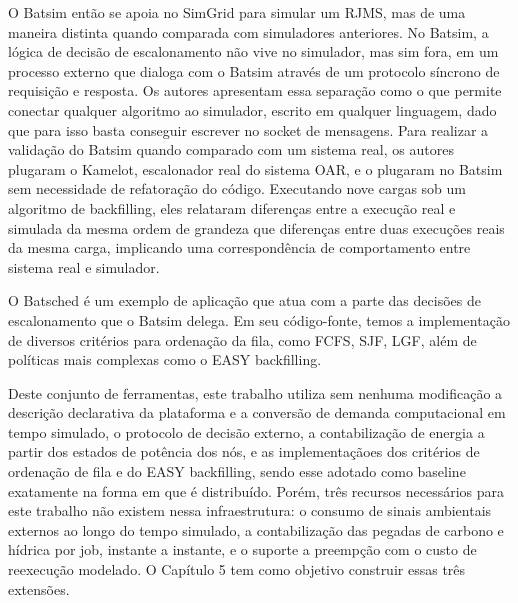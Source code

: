 O Batsim então se apoia no SimGrid para simular um RJMS, mas de uma maneira distinta quando comparada com 
simuladores anteriores. No Batsim, a lógica de decisão de escalonamento não vive no simulador, mas sim fora,
em um processo externo que dialoga com o Batsim através de um protocolo síncrono de requisição e resposta. 
Os autores apresentam essa separação como o que permite conectar qualquer algoritmo ao simulador, escrito em
qualquer linguagem, dado que para isso basta conseguir escrever no socket de mensagens. Para realizar a validação
do Batsim quando comparado com um sistema real, os autores plugaram o Kamelot, escalonador real do sistema OAR,
e o plugaram no Batsim sem necessidade de refatoração do código. Executando nove cargas sob um algoritmo de 
backfilling, eles relataram diferenças entre a execução real e simulada da mesma ordem de grandeza que diferenças
entre duas execuções reais da mesma carga, implicando uma correspondência de comportamento entre sistema real
e simulador.

O Batsched é um exemplo de aplicação que atua com a parte das decisões de escalonamento que o Batsim delega.
Em seu código-fonte, temos a implementação de diversos critérios para ordenação da fila, como FCFS, SJF, LGF,
além de políticas mais complexas como o EASY backfilling. 

Deste conjunto de ferramentas, este trabalho utiliza sem nenhuma modificação a descrição declarativa
da plataforma e a conversão de demanda computacional em tempo simulado, o protocolo de decisão externo,
a contabilização de energia a partir dos estados de potência dos nós, e as implementaçãoes dos critérios
de ordenação de fila e do EASY backfilling, sendo esse adotado como baseline exatamente na forma
em que é distribuído. Porém, três recursos necessários para este trabalho não existem nessa infraestrutura:
o consumo de sinais ambientais externos ao longo do tempo simulado, a contabilização das pegadas de carbono
e hídrica por job, instante a instante, e o suporte a preempção com o custo de reexecução modelado.
O Capítulo 5 tem como objetivo construir essas três extensões. 